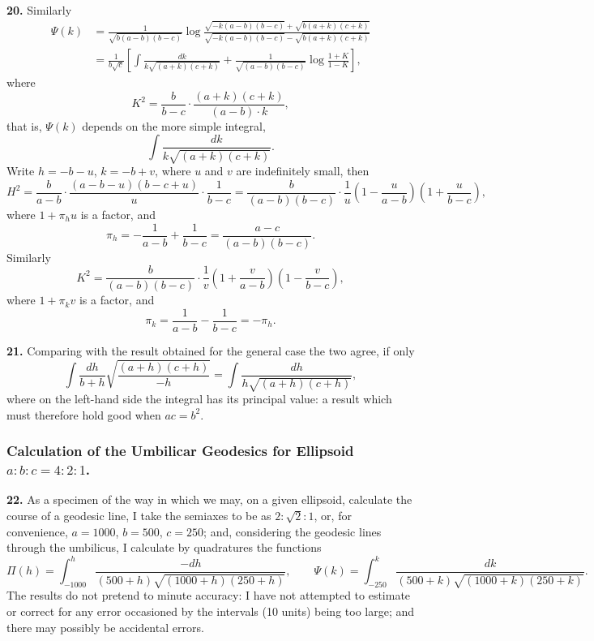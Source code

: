 \documentclass[11pt,a4paper]{article}
\begin{document}
\noindent\textbf{20.} Similarly
\begin{align*}
\Psi(k) &= \frac{1}{\sqrt{b(a-b)(b-c)}} \log \frac{\sqrt{-k(a-b)(b-c)} + \sqrt{b(a+k)(c+k)}}{\sqrt{-k(a-b)(b-c)} - \sqrt{b(a+k)(c+k)}} \\
&= \frac{1}{b\sqrt{c}} \left[ \int \frac{dk}{k\sqrt{(a+k)(c+k)}} + \frac{1}{\sqrt{(a-b)(b-c)}} \log \frac{1+K}{1-K} \right],
\end{align*}
where
\[
K^{2} = \frac{b}{b-c} \cdot \frac{(a+k)(c+k)}{(a-b) \cdot k},
\]
that is, $\Psi(k)$ depends on the more simple integral,
\[
\int \frac{dk}{k\sqrt{(a+k)(c+k)}}.
\]
Write $h = -b-u$, $k = -b+v$, where $u$ and $v$ are indefinitely small, then
\[
H^{2} = \frac{b}{a-b} \cdot \frac{(a-b-u)(b-c+u)}{u} \cdot \frac{1}{b-c} = \frac{b}{(a-b)(b-c)} \cdot \frac{1}{u} \left( 1 - \frac{u}{a-b} \right) \left( 1 + \frac{u}{b-c} \right),
\]
where $1 + \pi_{h}u$ is a factor, and
\[
\pi_{h} = -\frac{1}{a-b} + \frac{1}{b-c} = \frac{a-c}{(a-b)(b-c)}.
\]
Similarly
\[
K^{2} = \frac{b}{(a-b)(b-c)} \cdot \frac{1}{v} \left( 1 + \frac{v}{a-b} \right) \left( 1 - \frac{v}{b-c} \right),
\]
where $1 + \pi_{k}v$ is a factor, and
\[
\pi_{k} = \frac{1}{a-b} - \frac{1}{b-c} = -\pi_{h}.
\]

\noindent\textbf{21.} Comparing with the result obtained for the general case the two agree, if only
\[
\int \frac{dh}{b+h} \sqrt{\frac{(a+h)(c+h)}{-h}} = \int \frac{dh}{h\sqrt{(a+h)(c+h)}},
\]
where on the left-hand side the integral has its principal value: a result which must therefore hold good when $ac = b^{2}$.

\subsubsection*{Calculation of the Umbilicar Geodesics for Ellipsoid $a:b:c = 4:2:1$.}

\noindent\textbf{22.} As a specimen of the way in which we may, on a given ellipsoid, calculate the course of a geodesic line, I take the semiaxes to be as $2:\sqrt{2}:1$, or, for convenience, $a = 1000$, $b = 500$, $c = 250$; and, considering the geodesic lines through the umbilicus, I calculate by quadratures the functions
\[
\Pi(h) = \int_{-1000}^{h} \frac{-dh}{(500+h)\sqrt{(1000+h)(250+h)}}, \qquad \Psi(k) = \int_{-250}^{k} \frac{dk}{(500+k)\sqrt{(1000+k)(250+k)}}.
\]
The results do not pretend to minute accuracy: I have not attempted to estimate or correct for any error occasioned by the intervals (10 units) being too large; and there may possibly be accidental errors.
\end{document}
